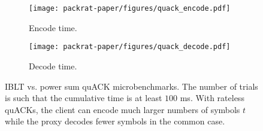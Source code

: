 \begin{figure}[t]
    \centering
    \begin{subfigure}[b]{0.49\linewidth}
        \centering
        \texttt{[image: packrat-paper/figures/quack\_encode.pdf]}
        \caption{Encode time.}
        \label{fig:quack:encode}
    \end{subfigure}
    \begin{subfigure}[b]{0.49\linewidth}
        \centering
        \texttt{[image: packrat-paper/figures/quack\_decode.pdf]}
        \caption{Decode time.}
        \label{fig:quack:decode}
    \end{subfigure}
    \caption{IBLT vs. power sum quACK microbenchmarks. The number of trials is
     such that the cumulative time is at least $100$ ms. With rateless quACKs,
     the client can encode much larger numbers of symbols $t$ while the proxy
     decodes fewer symbols in the common case.
     }
    \label{fig:quack}
\end{figure}